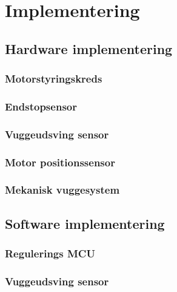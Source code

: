 \section{Implementering}
\subsection{Hardware implementering}

\subsubsection{Motorstyringskreds}

\subsubsection{Endstopsensor}

\subsubsection{Vuggeudsving sensor}

\subsubsection{Motor positionssensor}

\subsubsection{Mekanisk vuggesystem}


\subsection{Software implementering}
\subsubsection{Regulerings MCU}
\subsubsection{Vuggeudsving sensor}
